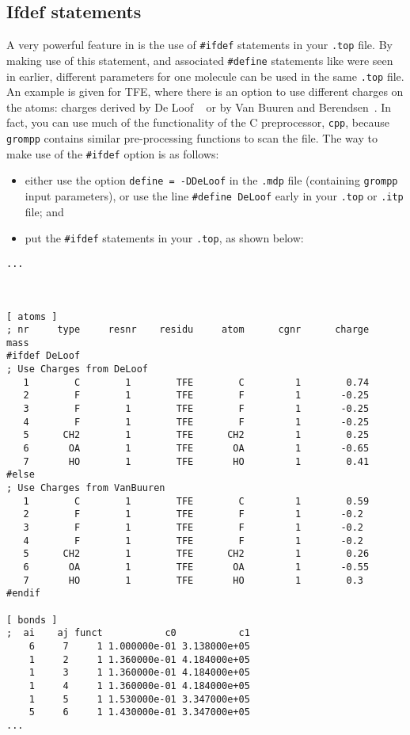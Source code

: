 \subsection{Ifdef statements}
\label{subsec:ifdef}
A very powerful feature in {\gromacs} is the use of {\tt \#ifdef}
statements in your {\tt *.top} file. By making use of this statement,
and associated {\tt \#define} statements like were seen in
 earlier,
different parameters for one molecule can be used in the same
{\tt *.top} file. An example is given for TFE, where there is an option to
use different charges on the atoms: charges derived by De Loof
{\etal}~\cite{Loof92} or by Van Buuren and
Berendsen~\cite{Buuren93a}. In fact, you can use much of the functionality of the
C preprocessor, {\tt cpp}, because {\tt grompp} contains similar pre-processing
functions to scan the file.  The
way to make use of the {\tt \#ifdef} option is as follows:
\begin{itemize}
\item either use the option {\tt define = -DDeLoof} in the
      {\tt *.mdp} file (containing {\tt grompp} input
      parameters), or use the line {\tt \#define DeLoof}
      early in your {\tt *.top} or {\tt *.itp} file; and
\item put the {\tt \#ifdef} statements in your {\tt *.top}, as
      shown below: 
\end{itemize}

{\small
\begin{verbatim}
...



[ atoms ]
; nr     type     resnr    residu     atom      cgnr      charge        mass
#ifdef DeLoof
; Use Charges from DeLoof
   1        C        1        TFE        C         1        0.74        
   2        F        1        TFE        F         1       -0.25        
   3        F        1        TFE        F         1       -0.25        
   4        F        1        TFE        F         1       -0.25        
   5      CH2        1        TFE      CH2         1        0.25        
   6       OA        1        TFE       OA         1       -0.65        
   7       HO        1        TFE       HO         1        0.41        
#else
; Use Charges from VanBuuren
   1        C        1        TFE        C         1        0.59        
   2        F        1        TFE        F         1       -0.2         
   3        F        1        TFE        F         1       -0.2         
   4        F        1        TFE        F         1       -0.2         
   5      CH2        1        TFE      CH2         1        0.26        
   6       OA        1        TFE       OA         1       -0.55        
   7       HO        1        TFE       HO         1        0.3         
#endif

[ bonds ]
;  ai    aj funct           c0           c1
    6     7     1 1.000000e-01 3.138000e+05 
    1     2     1 1.360000e-01 4.184000e+05 
    1     3     1 1.360000e-01 4.184000e+05 
    1     4     1 1.360000e-01 4.184000e+05 
    1     5     1 1.530000e-01 3.347000e+05 
    5     6     1 1.430000e-01 3.347000e+05 
...
\end{verbatim}}

